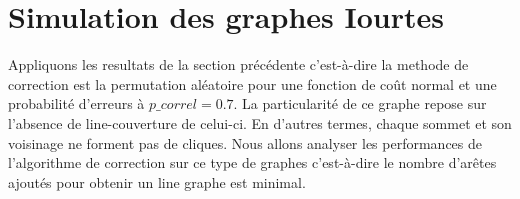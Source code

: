 \documentclass[onecolumn, 12pt]{book}
\begin{document}
\section{ Simulation des graphes Iourtes}
Appliquons les resultats de la section pr\'ec\'edente c'est-\`a-dire la methode de correction est la permutation al\'eatoire pour une fonction de co\^ut normal et une probabilit\'e d'erreurs \`a $p\_correl = 0.7$.
La particularit\'e de ce graphe repose sur l'absence de line-couverture de celui-ci. En d'autres termes, chaque sommet et son voisinage ne forment pas de cliques. 
\newline
Nous allons analyser les performances de  l'algorithme de correction sur ce type de graphes c'est-\`a-dire le nombre d'ar\^etes ajout\'es pour obtenir un line graphe est minimal. 
\end{document}
